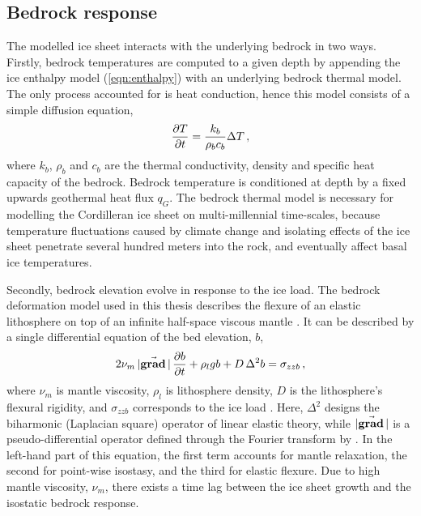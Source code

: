 \documentclass{article}
\newcommand{\vect}[1]{\va*{#1}} %
\renewcommand{\grad}[1]{\vect{\mathrm{grad}}\,#1}   %
\begin{document}
\subsection{Bedrock response}

The modelled ice sheet interacts with the underlying bedrock in two ways.
Firstly, bedrock temperatures are computed to a given depth by appending the
ice enthalpy model (\ref{eqn:enthalpy}) with an underlying bedrock thermal
model. The only process accounted for is heat conduction, hence this model
consists of a simple diffusion equation,
\begin{equation}
    \pdv{T}{t} = \frac{k_b}{\rho_b c_b} \Delta T \,,
\end{equation}
where $k_b$, $\rho_b$ and $c_b$ are the thermal conductivity, density and
specific heat capacity of the bedrock. Bedrock temperature is conditioned at
depth by a fixed upwards geothermal heat flux $q_G$. The bedrock thermal model
is necessary for modelling the Cordilleran ice sheet on multi-millennial
time-scales, because temperature fluctuations caused by climate change and
isolating effects of the ice sheet penetrate several hundred meters into the
rock, and eventually affect basal ice temperatures.

Secondly, bedrock elevation evolve in response to the ice load. The bedrock
deformation model used in this thesis describes the flexure of an elastic
lithosphere on top of an infinite half-space viscous mantle
\citep{Lingle.Clark.1985}. It can be described by a single differential
equation of the bed elevation, $b$,
\begin{equation}
    2\nu_m\,|\grad|\,\pdv{b}{t} + \rho_l g b + D\,\Delta^2 b = \sigma_{zzb} \,,
\end{equation}
where $\nu_m$ is mantle viscosity, $\rho_l$ is lithosphere density, $D$ is the
lithosphere's flexural rigidity, and $\sigma_{zzb}$ corresponds to the ice load
\citep{Bueler.etal.2007}. Here, $\Delta^2$ designs the biharmonic (Laplacian
square) operator of
linear elastic theory, while $|\grad|$ is a pseudo-differential operator
defined through the Fourier transform by \citet[Eq.~6]{Bueler.etal.2007}. In
the left-hand part of this equation, the first term accounts for mantle
relaxation, the second for point-wise isostasy, and the third for elastic
flexure. Due to high mantle viscosity, $\nu_m$, there exists a time lag between
the ice sheet growth and the isostatic bedrock response.
\end{document}

